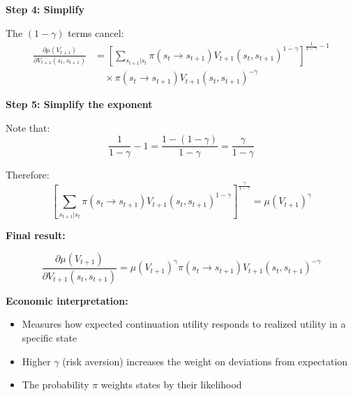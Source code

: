 \documentclass{beamer}
\begin{document}
\begin{frame}[allowframebreaks]
    \framebreak
    
    \textbf{Step 4: Simplify}
    
    The $(1-\gamma)$ terms cancel:
    \begin{equation*}
        \begin{aligned}
            \frac{\partial \mu(V_{t+1})}{\partial V_{t+1}(s_t, s_{t+1})} &= \left[ \sum_{s_{t+1}|s_t} \pi(s_t \to s_{t+1})V_{t+1}(s_t, s_{t+1})^{1-\gamma} \right]^{\frac{1}{1-\gamma}-1} \\
            &\quad \times \pi(s_t \to s_{t+1})V_{t+1}(s_t, s_{t+1})^{-\gamma}
        \end{aligned}
    \end{equation*}
    
    \framebreak
    
    \textbf{Step 5: Simplify the exponent}
    
    Note that:
    \begin{equation*}
        \frac{1}{1-\gamma} - 1 = \frac{1 - (1-\gamma)}{1-\gamma} = \frac{\gamma}{1-\gamma}
    \end{equation*}
    
    Therefore:
    \begin{equation*}
        \left[ \sum_{s_{t+1}|s_t} \pi(s_t \to s_{t+1})V_{t+1}(s_t, s_{t+1})^{1-\gamma} \right]^{\frac{\gamma}{1-\gamma}} = \mu(V_{t+1})^{\gamma}
    \end{equation*}
    
    \framebreak
    
    \textbf{Final result:}
    \begin{tcolorbox}[colback=blue!5!white, colframe=blue!75!black, title=Partial Derivative 2]
    \begin{equation*}
        \frac{\partial \mu(V_{t+1})}{\partial V_{t+1}(s_t, s_{t+1})} = \mu(V_{t+1})^{\gamma} \pi(s_t \to s_{t+1}) V_{t+1}(s_t, s_{t+1})^{-\gamma}
    \end{equation*}
    \end{tcolorbox}
    
    \textbf{Economic interpretation:}
    \begin{itemize}
        \item Measures how expected continuation utility responds to realized utility in a specific state
        \item Higher $\gamma$ (risk aversion) increases the weight on deviations from expectation
        \item The probability $\pi$ weights states by their likelihood
    \end{itemize}
\end{frame}
\end{document}
